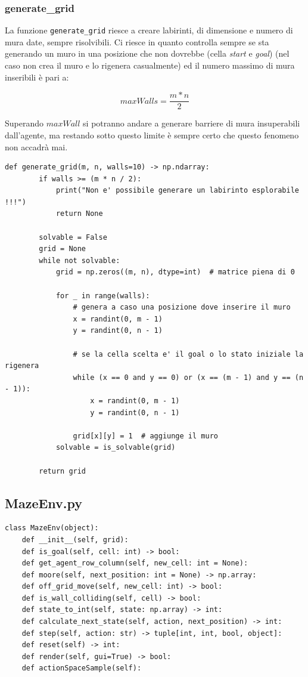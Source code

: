 \subsubsection{generate\_grid}
La funzione \lstinline[style=cmd]|generate_grid| riesce a creare labirinti, di dimensione e numero di mura date, sempre risolvibili. Ci riesce in quanto controlla sempre se sta generando un muro in una posizione che non dovrebbe (cella \textit{start} e \textit{goal}) (nel caso non crea il muro e lo rigenera casualmente) ed il numero massimo di mura inseribili \`{e} pari a: 

\[maxWalls = \frac{m * n}{2}\]

Superando $maxWall$ si potranno andare a generare barriere  di mura insuperabili dall'agente, ma restando sotto questo limite \`{e} sempre certo che questo fenomeno non accadr\`{a} mai.

\begin{lstlisting}[style=python, caption={Funzione per la generazione di labirinti casuali}]
	def generate_grid(m, n, walls=10) -> np.ndarray:
		if walls >= (m * n / 2):
			print("Non e' possibile generare un labirinto esplorabile !!!")
			return None
	
		solvable = False
		grid = None
		while not solvable:
			grid = np.zeros((m, n), dtype=int)  # matrice piena di 0
	
			for _ in range(walls):
				# genera a caso una posizione dove inserire il muro
				x = randint(0, m - 1)
				y = randint(0, n - 1)
	
				# se la cella scelta e' il goal o lo stato iniziale la rigenera
				while (x == 0 and y == 0) or (x == (m - 1) and y == (n - 1)):
					x = randint(0, m - 1)
					y = randint(0, n - 1)
	
				grid[x][y] = 1  # aggiunge il muro
			solvable = is_solvable(grid)
	
		return grid
\end{lstlisting}

\subsection{MazeEnv.py}

\begin{lstlisting}[style=python, caption={Metodi di MazeEnv.py}]
class MazeEnv(object):
	def __init__(self, grid):
	def is_goal(self, cell: int) -> bool:
	def get_agent_row_column(self, new_cell: int = None):
	def moore(self, next_position: int = None) -> np.array:
	def off_grid_move(self, new_cell: int) -> bool:
	def is_wall_colliding(self, cell) -> bool:
	def state_to_int(self, state: np.array) -> int:
	def calculate_next_state(self, action, next_position) -> int:
	def step(self, action: str) -> tuple[int, int, bool, object]:
	def reset(self) -> int:
	def render(self, gui=True) -> bool:
	def actionSpaceSample(self):
	
\end{lstlisting}

